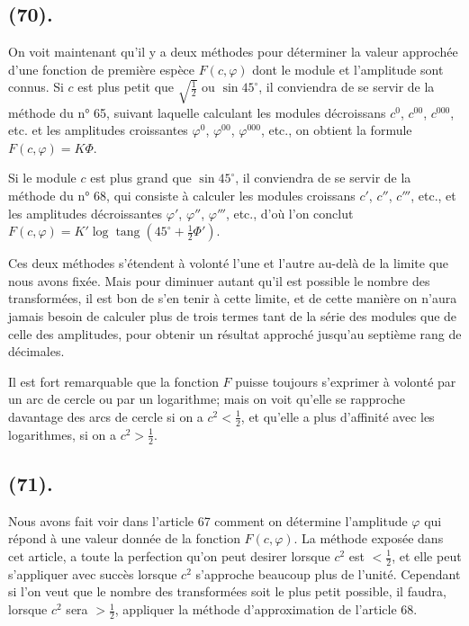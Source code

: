 \documentclass{article}
\begin{document}
\subsection*{(70).}

On voit maintenant qu'il y a deux méthodes pour déterminer la valeur approchée d'une fonction de première espèce $F(c,\varphi)$ dont le module et l'amplitude sont connus. Si $c$ est plus petit que $\sqrt{\frac{1}{2}}$ ou $\sin45^{\circ}$, il conviendra de se servir de la méthode du n° 65, suivant laquelle calculant les modules décroissans $c^{0}$, $c^{00}$, $c^{000}$, etc. et les amplitudes croissantes $\varphi^{0}$, $\varphi^{00}$, $\varphi^{000}$, etc., on obtient la formule $F(c,\varphi)=K\Phi$.

Si le module $c$ est plus grand que $\sin45^{\circ}$, il conviendra de se servir de la méthode du n° 68, qui consiste à calculer les modules croissans $c'$, $c''$, $c'''$, etc., et les amplitudes décroissantes $\varphi'$, $\varphi''$, $\varphi'''$, etc., d'où l'on conclut $F(c,\varphi)=K'\log\operatorname{tang}(45^{\circ}+\frac{1}{2}\Phi')$.

Ces deux méthodes s'étendent à volonté l'une et l'autre au-delà de la limite que nous avons fixée. Mais pour diminuer autant qu'il est possible le nombre des transformées, il est bon de s'en tenir à cette limite, et de cette manière on n'aura jamais besoin de calculer plus de trois termes tant de la série des modules que de celle des amplitudes, pour obtenir un résultat approché jusqu'au septième rang de décimales.

Il est fort remarquable que la fonction $F$ puisse toujours s'exprimer à volonté par un arc de cercle ou par un logarithme; mais on voit qu'elle se rapproche davantage des arcs de cercle si on a $c^{2}<\frac{1}{2}$, et qu'elle a plus d'affinité avec les logarithmes, si on a $c^{2}>\frac{1}{2}$.

\subsection*{(71).}

Nous avons fait voir dans l'article 67 comment on détermine l'amplitude $\varphi$ qui répond à une valeur donnée de la fonction $F(c,\varphi)$. La méthode exposée dans cet article, a toute la perfection qu'on peut desirer lorsque $c^{2}$ est $<\frac{1}{2}$, et elle peut s'appliquer avec succès lorsque $c^{2}$ s'approche beaucoup plus de l'unité. Cependant si l'on veut que le nombre des transformées soit le plus petit possible, il faudra, lorsque $c^{2}$ sera $>\frac{1}{2}$, appliquer la méthode d'approximation de l'article 68.
\end{document}

